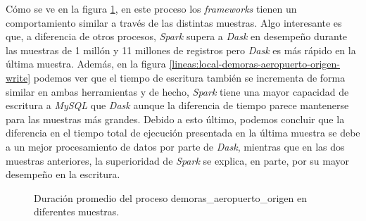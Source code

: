 Cómo se ve en la figura \ref{lineas:local-demoras-aeropuerto-origen}, en este proceso los \textit{frameworks} tienen un comportamiento similar a través de las distintas muestras. Algo interesante es que, a diferencia de otros procesos, \textit{Spark} supera a \textit{Dask} en desempeño durante las muestras de 1 millón y 11 millones de registros pero \textit{Dask} es más rápido en la última muestra. Además, en la figura \ref{lineas:local-demoras-aeropuerto-origen-write} podemos ver que el tiempo de escritura también se incrementa de forma similar en ambas herramientas y de hecho, \textit{Spark} tiene una mayor capacidad de escritura a \textit{MySQL} que \textit{Dask} aunque la diferencia de tiempo parece mantenerse para las muestras más grandes. Debido a esto último, podemos concluir que la diferencia en el tiempo total de ejecución presentada en la última muestra se debe a un mejor procesamiento de datos por parte de \textit{Dask}, mientras que en las dos muestras anteriores, la superioridad de \textit{Spark} se explica, en parte, por su mayor desempeño en la escritura. 

\begin{figure}
\centering
{}
\caption{Duración promedio del proceso demoras\_aeropuerto\_origen en diferentes muestras.}
\label{lineas:local-demoras-aeropuerto-origen}
\end{figure}

